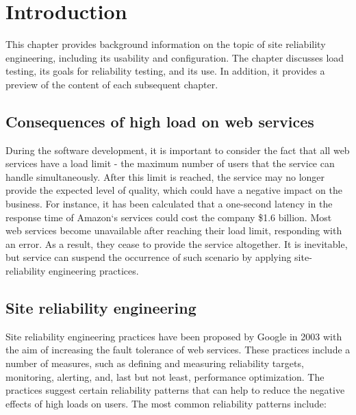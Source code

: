 \chapter{Introduction}
\label{ch:intro}

This chapter provides background information on the topic of site reliability engineering, including its usability and configuration. The chapter discusses load testing, its goals for reliability testing, and its use. In addition, it provides a preview of the content of each subsequent chapter.

\section{Consequences of high load on web services}\label{sec:consequences-of-high-load-on-web-services}
During the software development, it is important to consider the fact that all web services have a load limit - the maximum number of users that the service can handle simultaneously.
After this limit is reached, the service may no longer provide the expected level of quality, which could have a negative impact on the business.
For instance, it has been calculated that a one-second latency in the response time of Amazon`s services could cost the company \$1.6 billion.
Most web services become unavailable after reaching their load limit, responding with an error.
As a result, they cease to provide the service altogether. It is inevitable, but service can suspend the occurrence
of such scenario by applying site-reliability engineering practices.

\section{Site reliability engineering}\label{sec:site-reliability-engineering}
Site reliability engineering practices have been proposed by Google in 2003 with the aim of increasing the fault tolerance of web services. These practices include a number of measures, such as defining and measuring reliability targets, monitoring, alerting, and, last but not least, performance optimization. The practices suggest certain reliability patterns that can help to reduce the negative effects of high loads on users.
The most common reliability patterns include: 

